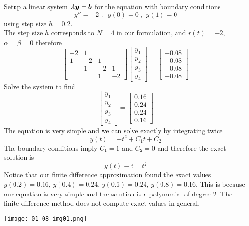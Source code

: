 \begin{example}
Setup a linear system $A \boldsymbol{y} = \boldsymbol{b}$ for the equation with boundary conditions
$$
y'' = -2 \ \ , \ \ y(0) = 0 \ , \ \ y(1) = 0
$$
using step size $h=0.2$. \\

The step size $h$ corresponds to $N=4$ in our formulation, and $r(t) = -2$, $\alpha = \beta = 0$ therefore
$$
\left[ \begin{array}{rrrr}
-2 & 1 & & \\
1 & -2 & 1 & \\
& 1 & -2 & 1 \\
& & 1 & -2
\end{array} \right]
\begin{bmatrix} y_1 \\ y_2 \\ y_3 \\ y_4 \end{bmatrix}
=
\begin{bmatrix} -0.08 \\ -0.08 \\ -0.08 \\ -0.08 \end{bmatrix}
$$
Solve the system to find
$$
\begin{bmatrix} y_1 \\ y_2 \\ y_3 \\ y_4 \end{bmatrix}
=
\begin{bmatrix} 0.16 \\ 0.24 \\ 0.24 \\ 0.16 \end{bmatrix}
$$
The equation is very simple and we can solve exactly by integrating twice
$$
y(t) = -t^2 + C_1t +C_2
$$
The boundary conditions imply $C_1 = 1$ and $C_2 = 0$ and therefore the exact solution is
$$
y(t) = t - t^2
$$
Notice that our finite difference approximation found the exact values $y(0.2) = 0.16$, $y(0.4) = 0.24$, $y(0.6) = 0.24$, $y(0.8) = 0.16$. This is because our equation is very simple and the solution is a polynomial of degree 2. The finite difference method does not compute exact values in general.
\begin{center}
\texttt{[image: 01\_08\_img01.png]}
\end{center}
\end{example}

